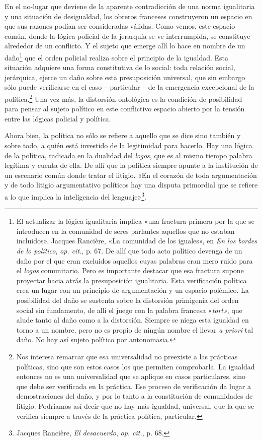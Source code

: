 En el no-lugar que deviene de la aparente contradicción de una norma igualitaria y una situación de desigualdad, los obreros franceses construyeron un espacio en que sus razones podían ser consideradas válidas. Como vemos, este espacio común, donde la lógica policial de la jerarquía se ve interrumpida, se constituye alrededor de un conflicto. Y el sujeto que emerge allí lo hace en nombre de un daño\footnote{El actualizar la lógica igualitaria implica «una fractura primera por la que se introducen en la comunidad de seres parlantes aquellos que no estaban incluidos». Jacques Rancière, «La comunidad de los iguales», en \emph{En los bordes de lo político}, \emph{op. cit.}, p. 67. De allí que todo acto político devenga de un daño por el que eran excluidos aquellos cuyas palabras eran mero ruido para el \emph{logos} comunitario. Pero es importante destacar que esa fractura supone proyectar hacia atrás la presuposición igualitaria. Esta verificación política crea un lugar con un principio de argumentación y un espacio polémico. La posibilidad del daño se sustenta sobre la distorsión primigenia del orden social sin fundamento, de allí el juego con la palabra francesa «\emph{tort»}, que alude tanto al daño como a la distorsión. Siempre se niega esta igualdad en torno a un nombre, pero no es propio de ningún nombre el llevar \emph{a priori} tal daño. No hay así sujeto político por antonomasia.} que el orden policial realiza sobre el principio de la igualdad. Esta situación adquiere una forma constitutiva de lo social: toda relación social, jerárquica, ejerce un daño sobre esta presuposición universal, que sin embargo sólo puede verificarse en el caso -- particular -- de la emergencia excepcional de la política.\footnote{Nos interesa remarcar que esa universalidad no preexiste a las prácticas políticas, sino que son estos casos los que permiten comprobarla. La igualdad entonces no es una universalidad que se aplique en casos particulares, sino que debe ser verificada en la práctica. Ese proceso de verificación da lugar a demostraciones del daño, y por lo tanto a la constitución de comunidades de litigio. Podríamos así decir que no hay más igualdad, universal, que la que se verifica siempre a través de la práctica política, particular.} Una vez más, la distorsión ontológica es la condición de posibilidad para pensar al sujeto político en este conflictivo espacio abierto por la tensión entre las lógicas policial y política.

Ahora bien, la política no sólo se refiere a aquello que se dice sino también y sobre todo, a quién está investido de la legitimidad para hacerlo. Hay una lógica de la política, radicada en la dualidad del \emph{logos}, que es al mismo tiempo palabra legítima y cuenta de ella. De allí que la política siempre apunte a la institución de un escenario común donde tratar el litigio. «En el corazón de toda argumentación y de todo litigio argumentativo políticos hay una disputa primordial que se refiere a lo que implica la inteligencia del lenguaje»\footnote{Jacques Rancière, \emph{El desacuerdo}, \emph{op. cit.}, p. 68.}.

